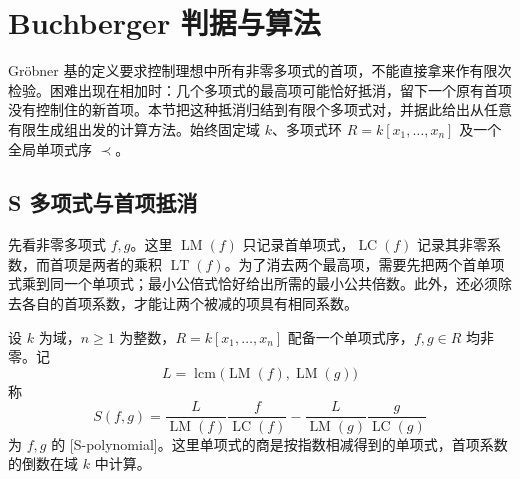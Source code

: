 

\section{Buchberger 判据与算法}
\label{b1:sec:F03}

Gröbner 基的定义要求控制理想中所有非零多项式的首项，不能直接拿来作有限次检验。困难出现在相加时：几个多项式的最高项可能恰好抵消，留下一个原有首项没有控制住的新首项。本节把这种抵消归结到有限个多项式对，并据此给出从任意有限生成组出发的计算方法。始终固定域 \(k\)、多项式环 \(R=k[x_1,\ldots,x_n]\) 及一个全局单项式序 \(\prec\)。

\subsection{S 多项式与首项抵消}
\label{b1:subsec:F03:01}

先看非零多项式 \(f,g\)。这里 \(\operatorname{LM}(f)\) 只记录首单项式，\(\operatorname{LC}(f)\) 记录其非零系数，而首项是两者的乘积 \(\operatorname{LT}(f)\)。为了消去两个最高项，需要先把两个首单项式乘到同一个单项式；最小公倍式恰好给出所需的最小公共倍数。此外，还必须除去各自的首项系数，才能让两个被减的项具有相同系数。

\begin{definition}\label{b1:def:F-s-polynomial}
	设 \(k\) 为域，\(n\geq1\) 为整数，\(R=k[x_1,\ldots,x_n]\) 配备一个单项式序，\(f,g\in R\) 均非零。记
	\[
		L=\operatorname{lcm}\bigl(\operatorname{LM}(f),\operatorname{LM}(g)\bigr)
	\]
	称
	\begin{equation}\label{b1:eq:F-s-polynomial}
		S(f,g)= \frac{L}{\operatorname{LM}(f)}\frac{f}{\operatorname{LC}(f)} -\frac{L}{\operatorname{LM}(g)}\frac{g}{\operatorname{LC}(g)}
	\end{equation}
	为 \(f,g\) 的 [S-polynomial]。这里单项式的商是按指数相减得到的单项式，首项系数的倒数在域 \(k\) 中计算。
\end{definition}

